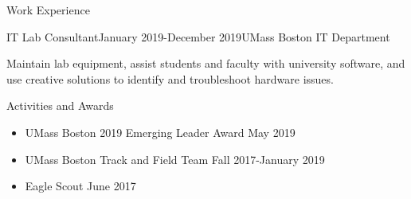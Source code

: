 \documentclass{resume} %
\begin{document}
\begin{Section}{Work Experience}
	\begin{Job}{IT Lab Consultant}{January 2019-December 2019}{UMass Boston IT Department}
		\item Maintain lab equipment, assist students and faculty with university software, and use creative solutions to identify and troubleshoot hardware issues.
	\end{Job}
	
	
\end{Section}

\begin{Section}{Activities and Awards} \itemsep -3pt
	\begin{itemize}[leftmargin=*]
		\itemsep -0.5em %
		\item UMass Boston 2019 Emerging Leader Award             \hfill {May 2019}
		\item UMass Boston Track and Field Team                   \hfill {Fall 2017-January 2019}
		\item Eagle Scout                                         \hfill {June 2017} 
	\end{itemize}
\end{Section}
\end{document}
